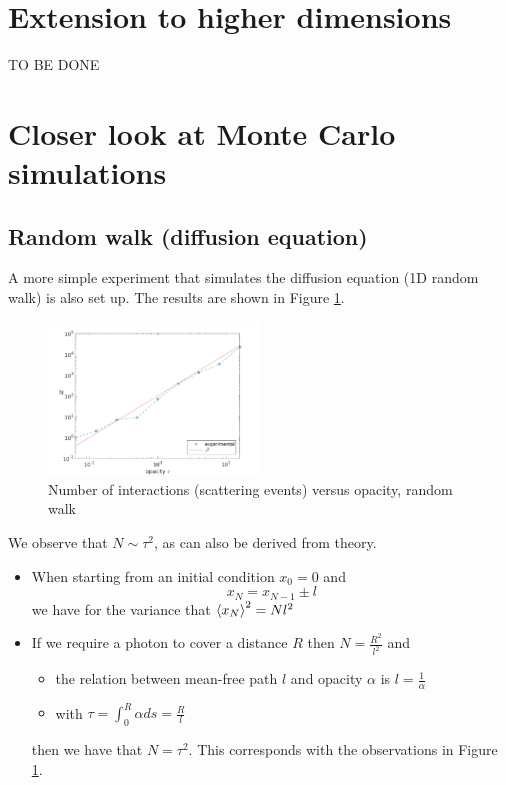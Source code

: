 \documentclass[../main/main.tex]{subfiles}
\begin{document}
\newpage
\section{Extension to higher dimensions}
TO BE DONE

\newpage
\section{Closer look at Monte Carlo simulations}
\label{diffusion_Monte_Carlo_mean_free_path}

\subsection{Random walk (diffusion equation)} A more simple experiment that simulates the diffusion equation (1D random walk) is also set up. The results are shown in Figure \ref{random_walk_N_vs_tau}.
	\begin{figure}[!htp]
	\centering
	\includegraphics[width=0.5\textwidth]{../../introductory_exercises/limb_darkening/data/diff_N_vs_opacity.png}
	\caption{Number of interactions (scattering events) versus 	opacity, random walk}
	\label{random_walk_N_vs_tau}
	\end{figure}
We observe that $N \sim \tau^2$, as can also be derived from theory.

\begin{itemize}
\item When starting from an initial condition $x_0 = 0$ and 
\begin{equation}
x_N = x_{N-1} \pm l
\end{equation}
we have for the variance that $\braket{x_N}^2 = N l^2$ 
\item If we require a photon to cover a distance $R$ then $N = \frac{R^2}{l^2}$ and
\begin{itemize}
\item the relation between mean-free path $l$ and opacity $\alpha$ is $l = \frac{1}{\alpha}$
\item with $\tau = \int_0^R \alpha ds = \frac{R}{l}$
\end{itemize}
then we have that $N = \tau^2$. This corresponds with the observations in Figure \ref{random_walk_N_vs_tau}.
\end{itemize}
\end{document}
